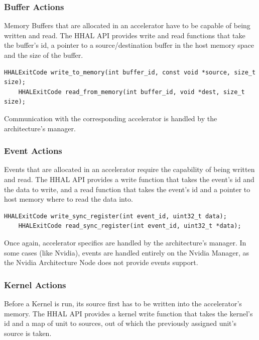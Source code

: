 \subsubsection{Buffer Actions}

Memory Buffers that are allocated in an accelerator have to be capable of being written and read. The HHAL API provides write and read functions that take the buffer's id, a pointer to a source/destination buffer in the host memory space and the size of the buffer.

\begin{lstlisting}[style=CStyle, caption=HHAL API - Buffer actions]
    HHALExitCode write_to_memory(int buffer_id, const void *source, size_t size);
    HHALExitCode read_from_memory(int buffer_id, void *dest, size_t size);
\end{lstlisting}

Communication with the corresponding accelerator is handled by the architecture's manager.

\subsubsection{Event Actions}
Events that are allocated in an accelerator require the capability of being written and read. The HHAL API provides a write function that takes the event's id and the data to write, and a read function that takes the event's id and a pointer to host memory where to read the data into.

\begin{lstlisting}[style=CStyle, caption=HHAL API - Event actions]
    HHALExitCode write_sync_register(int event_id, uint32_t data);
    HHALExitCode read_sync_register(int event_id, uint32_t *data);
\end{lstlisting}

Once again, accelerator specifics are handled by the architecture's manager. In some cases (like Nvidia), events are handled entirely on the Nvidia Manager, as the Nvidia Architecture Node does not provide events support.

\subsubsection{Kernel Actions} \label{HHAL:KernelActions}
Before a Kernel is run, its source first has to be written into the accelerator's memory. The HHAL API provides a kernel write function that takes the kernel's id and a map of unit to sources, out of which the previously assigned unit's source is taken.

